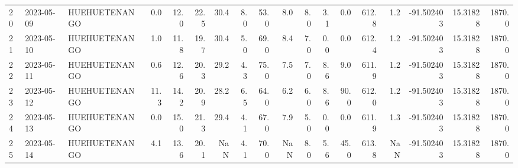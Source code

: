 \documentclass[12pt]{article}
\begin{document}
\begin{center}
\begin{tabular}{lllrrrrrrrrrrrrrrr}
20  & 2023-05-09 &  HUEHUETENANGO &     0.0 &  12.0 &   22.5 &  30.4 &      8.0 &     53.0 &        8.0 &  8.0 &         3.1 &         0.0 &      612.8 &        1.2 & -91.502403 &  15.31828 &   1870.0 \\
21  & 2023-05-10 &  HUEHUETENANGO &     1.0 &  11.8 &   19.7 &  30.4 &      5.0 &     69.0 &        8.4 &  7.0 &         0.0 &         0.0 &      612.4 &        1.2 & -91.502403 &  15.31828 &   1870.0 \\
22  & 2023-05-11 &  HUEHUETENANGO &     0.6 &  12.6 &   20.3 &  29.2 &      4.3 &     75.0 &        7.5 &  7.0 &         8.6 &         9.0 &      611.9 &        1.2 & -91.502403 &  15.31828 &   1870.0 \\
23  & 2023-05-12 &  HUEHUETENANGO &    11.3 &  14.2 &   20.9 &  28.2 &      6.5 &     64.0 &        6.2 &  6.0 &         8.6 &        90.0 &      612.0 &        1.2 & -91.502403 &  15.31828 &   1870.0 \\
24  & 2023-05-13 &  HUEHUETENANGO &     0.0 &  15.0 &   21.3 &  29.4 &      4.1 &     67.0 &        7.9 &  5.0 &         0.0 &         0.0 &      611.9 &        1.3 & -91.502403 &  15.31828 &   1870.0 \\
25  & 2023-05-14 &  HUEHUETENANGO &     4.1 &  13.6 &   20.1 &   NaN &      4.1 &     70.0 &        NaN &  8.0 &         5.6 &        45.0 &      613.8 &        NaN & -91.502403 &  15.31828 &   1870.0 \\
\bottomrule
\end{tabular}

        
        \end{center}
        
\end{document}
